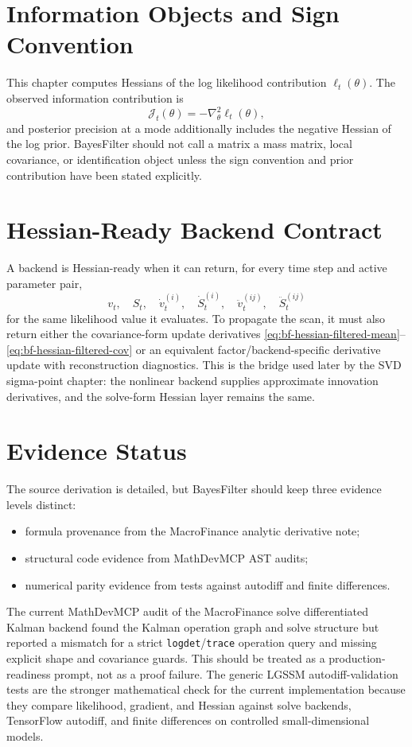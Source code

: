 \section{Information Objects and Sign Convention}
\label{sec:bf-hessian-information}

This chapter computes Hessians of the log likelihood contribution
$\ell_t(\theta)$.  The observed information contribution is
\[
  \mathcal{J}_t(\theta)=-\nabla_\theta^2\ell_t(\theta),
\]
and posterior precision at a mode additionally includes the negative Hessian of
the log prior.  BayesFilter should not call a matrix a mass matrix, local
covariance, or identification object unless the sign convention and prior
contribution have been stated explicitly.

\section{Hessian-Ready Backend Contract}
\label{sec:bf-hessian-ready-contract}

A backend is Hessian-ready when it can return, for every time step and active
parameter pair,
\[
  v_t,\quad S_t,\quad
  \dot v_t^{(i)},\quad \dot S_t^{(i)},\quad
  \ddot v_t^{(ij)},\quad \ddot S_t^{(ij)}
\]
for the same likelihood value it evaluates.  To propagate the scan, it must also
return either the covariance-form update derivatives
\eqref{eq:bf-hessian-filtered-mean}--\eqref{eq:bf-hessian-filtered-cov} or an
equivalent factor/backend-specific derivative update with reconstruction
diagnostics.  This is the bridge used later by the SVD sigma-point chapter: the
nonlinear backend supplies approximate innovation derivatives, and the
solve-form Hessian layer remains the same.

\section{Evidence Status}
\label{sec:bf-hessian-evidence-status}

The source derivation is detailed, but BayesFilter should keep three evidence
levels distinct:
\begin{itemize}
  \item formula provenance from the MacroFinance analytic derivative note;
  \item structural code evidence from MathDevMCP AST audits;
  \item numerical parity evidence from tests against autodiff and finite
    differences.
\end{itemize}

The current MathDevMCP audit of the MacroFinance solve differentiated Kalman
backend found the Kalman operation graph and solve structure but reported a
mismatch for a strict \texttt{logdet}/\texttt{trace} operation query and missing
explicit shape and covariance guards.  This should be treated as a
production-readiness prompt, not as a proof failure.  The generic LGSSM
autodiff-validation tests are the stronger mathematical check for the current
implementation because they compare likelihood, gradient, and Hessian against
solve backends, TensorFlow autodiff, and finite differences on controlled
small-dimensional models.
